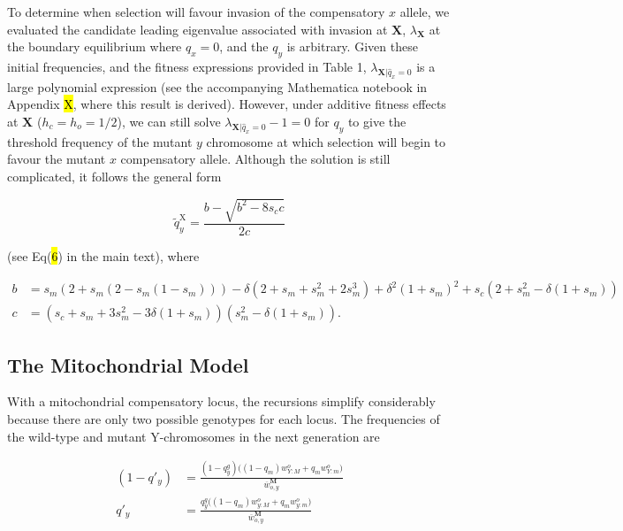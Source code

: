 \documentclass{article}
\begin{document}
\noindent To determine when selection will favour invasion of the compensatory $x$ allele, we evaluated the candidate leading eigenvalue associated with invasion at $\mathbf{X}$, $\lambda_{\mathbf{X}}$ at the boundary equilibrium where $q_x = 0$, and the $q_y$ is arbitrary. Given these initial frequencies, and the fitness expressions provided in Table 1, $\lambda_{\mathbf{X}|\hat{q}_x = 0}$ is a large polynomial expression (see the accompanying Mathematica notebook in Appendix \hl{X}, where this result is derived). However, under additive fitness effects at $\mathbf{X}$ ($h_c = h_o = 1/2$), we can still solve $\lambda_{\mathbf{X}|\hat{q}_x = 0} - 1 = 0$ for $q_y$ to give the threshold frequency of the mutant $y$ chromosome at which selection will begin to favour the mutant $x$ compensatory allele. Although the solution is still complicated, it follows the general form

\begin{equation} \label{eq:xInvDelta-threshold}
	\tilde{q}_y^{\text{X}} = \frac{b - \sqrt{b^2 - 8 s_c c}} {2 c}
\end{equation}

\noindent (see Eq(\hl{6}) in the main text), where 

\begin{subequations}
	\begin{align}
		b &= s_m (2 + s_m (2 - s_m(1 - s_m))) - \delta (2 + s_m + s_m^2 + 2 s_m^3) + \delta^2(1 + s_m)^2 + s_c (2 + s_m^2 - \delta(1 + s_m)) \\
		c &= (s_c + s_m + 3 s_m^2 - 3 \delta(1 + s_m)) (s_m^2 - \delta(1 + s_m)).
	\end{align}
\end{subequations}

\noindent 


\newpage{}
\subsection{The Mitochondrial Model}

With a mitochondrial compensatory locus, the recursions simplify considerably because there are only two possible genotypes for each locus. The frequencies of the wild-type and mutant Y-chromosomes in the next generation are 

\begin{subequations}\label{eq:Mito-YLocusRecursions} 
	\begin{align} 
		(1 - q'_{y}) &= \frac{(1 - q^g_{y})\big((1 - q_m)w^o_{Y:M} + q_m w^o_{Y:m} \big)} {\overline{w}^{\mathbf{M}}_{o,y}} \label{eq:Mito-YRec1} \\ 
		q'_{y} &= \frac{q^g_{y}\big((1 - q_m)w^o_{y:M} + q_m w^o_{y:m} \big)} {\overline{w}^{\mathbf{M}}_{o,y}} \label{eq:Mito-yRec2}
	\end{align}
\end{subequations}
\end{document}
